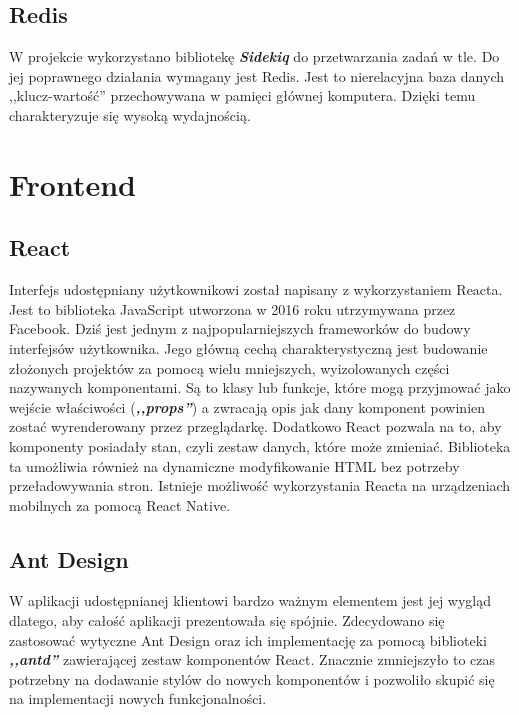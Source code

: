 \documentclass[declaration,shortabstract]{iithesis}
\begin{document}
\subsection{Redis}
W projekcie wykorzystano bibliotekę \textbf{\textit{Sidekiq}} do przetwarzania zadań w tle. Do jej poprawnego działania wymagany jest Redis. Jest to nierelacyjna baza danych ,,klucz-wartość'' przechowywana w pamięci głównej komputera. Dzięki temu charakteryzuje się wysoką wydajnością.
\section{Frontend}

\subsection{React}
Interfejs udostępniany użytkownikowi został napisany z wykorzystaniem Reacta. Jest to biblioteka JavaScript utworzona w 2016 roku utrzymywana przez Facebook. Dziś jest jednym z najpopularniejszych frameworków do budowy interfejsów użytkownika. Jego główną cechą charakterystyczną jest budowanie złożonych projektów za pomocą wielu mniejszych, wyizolowanych części nazywanych komponentami. Są to klasy lub funkcje, które mogą przyjmować jako wejście właściwości (\textbf{\textit{,,props''}}) a zwracają opis jak dany komponent powinien zostać wyrenderowany przez przeglądarkę. Dodatkowo React pozwala na to, aby komponenty posiadały stan, czyli zestaw danych, które może zmieniać. Biblioteka ta umożliwia również na dynamiczne modyfikowanie HTML bez potrzeby przeładowywania stron. Istnieje możliwość wykorzystania Reacta na urządzeniach mobilnych za pomocą React Native.

\subsection{Ant Design}
W aplikacji udostępnianej klientowi bardzo ważnym elementem jest jej wygląd dlatego, aby całość aplikacji prezentowała się spójnie. Zdecydowano się zastosować wytyczne Ant Design oraz ich implementację za pomocą biblioteki \textbf{\textit{,,antd''}} zawierającej zestaw komponentów React. Znacznie zmniejszyło to czas potrzebny na dodawanie stylów do nowych komponentów i pozwoliło skupić się na implementacji nowych funkcjonalności. 
\end{document}
